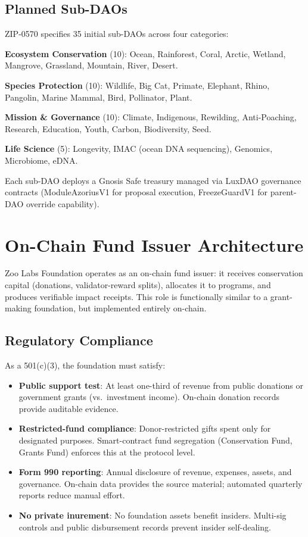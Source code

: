 \documentclass[11pt,letterpaper]{article}
\begin{document}
\subsection{Planned Sub-DAOs}

ZIP-0570 specifies 35 initial sub-DAOs across four categories:

\textbf{Ecosystem Conservation} (10): Ocean, Rainforest, Coral, Arctic, Wetland, Mangrove, Grassland, Mountain, River, Desert.

\textbf{Species Protection} (10): Wildlife, Big Cat, Primate, Elephant, Rhino, Pangolin, Marine Mammal, Bird, Pollinator, Plant.

\textbf{Mission \& Governance} (10): Climate, Indigenous, Rewilding, Anti-Poaching, Research, Education, Youth, Carbon, Biodiversity, Seed.

\textbf{Life Science} (5): Longevity, IMAC (ocean DNA sequencing), Genomics, Microbiome, eDNA.

Each sub-DAO deploys a Gnosis Safe treasury managed via LuxDAO governance contracts (ModuleAzoriusV1 for proposal execution, FreezeGuardV1 for parent-DAO override capability).

\section{On-Chain Fund Issuer Architecture}
\label{sec:issuer}

Zoo Labs Foundation operates as an on-chain fund issuer: it receives conservation capital (donations, validator-reward splits), allocates it to programs, and produces verifiable impact receipts. This role is functionally similar to a grant-making foundation, but implemented entirely on-chain.

\subsection{Regulatory Compliance}

As a 501(c)(3), the foundation must satisfy:

\begin{itemize}
    \item \textbf{Public support test}: At least one-third of revenue from public donations or government grants (vs.\ investment income). On-chain donation records provide auditable evidence.
    \item \textbf{Restricted-fund compliance}: Donor-restricted gifts spent only for designated purposes. Smart-contract fund segregation (Conservation Fund, Grants Fund) enforces this at the protocol level.
    \item \textbf{Form 990 reporting}: Annual disclosure of revenue, expenses, assets, and governance. On-chain data provides the source material; automated quarterly reports reduce manual effort.
    \item \textbf{No private inurement}: No foundation assets benefit insiders. Multi-sig controls and public disbursement records prevent insider self-dealing.
\end{itemize}
\end{document}
